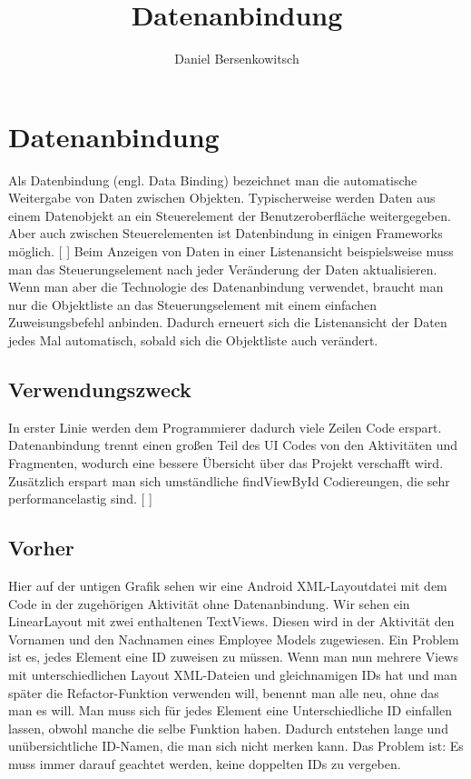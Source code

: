 \documentclass[FIPLY_base.tex]{subfiles}
\title{Datenanbindung}
\author{Daniel Bersenkowitsch}
\begin{document}
\section{Datenanbindung}
Als Datenbindung (engl. Data Binding) bezeichnet man die automatische Weitergabe von Daten zwischen Objekten. Typischerweise werden Daten aus einem Datenobjekt an ein Steuerelement der Benutzeroberfläche weitergegeben. Aber auch zwischen Steuerelementen ist Datenbindung in einigen Frameworks möglich. [ \cite{datbdef}]
\newline
Beim Anzeigen von Daten in einer Listenansicht beispielsweise muss man das Steuerungselement nach jeder Veränderung der Daten aktualisieren. Wenn man aber die Technologie des Datenanbindung verwendet, braucht man nur die Objektliste an das Steuerungselement mit einem einfachen Zuweisungsbefehl anbinden. Dadurch erneuert sich die Listenansicht der Daten jedes Mal automatisch, sobald sich die Objektliste auch verändert.


\subsection{Verwendungszweck}
In erster Linie werden dem Programmierer dadurch viele Zeilen Code erspart. Datenanbindung trennt einen großen Teil des UI Codes von den Aktivitäten und Fragmenten, wodurch eine bessere Übersicht über das Projekt verschafft wird. Zusätzlich erspart man sich umständliche findViewById Codiereungen, die sehr performancelastig sind. [ \cite{datbusing}]


\subsection{Vorher}

Hier auf der untigen Grafik sehen wir eine Android XML-Layoutdatei mit dem Code in der zugehörigen Aktivität ohne Datenanbindung. Wir sehen ein LinearLayout mit zwei enthaltenen TextViews. Diesen wird in der Aktivität den Vornamen und den Nachnamen eines Employee Models zugewiesen. Ein Problem ist es, jedes Element eine ID zuweisen zu müssen. Wenn man nun mehrere Views mit unterschiedlichen Layout XML-Dateien und gleichnamigen IDs hat und man später die Refactor-Funktion verwenden will, benennt man alle neu, ohne das man es will. Man muss sich für jedes Element eine Unterschiedliche ID einfallen lassen, obwohl manche die selbe Funktion haben. Dadurch entstehen lange und unübersichtliche ID-Namen, die man sich nicht merken kann. Das Problem ist: Es muss immer darauf geachtet werden, keine doppelten IDs zu vergeben.\\
\end{document}
